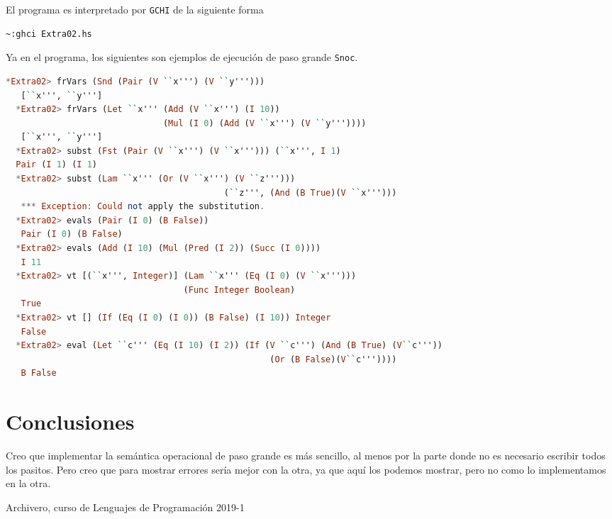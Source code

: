 \documentclass[spanish,12pt,letterpaper]{article}
\begin{document}
El programa es interpretado por \texttt{GCHI} de la siguiente forma
\begin{lstlisting}[]
  ~:ghci Extra02.hs
\end{lstlisting}

Ya en el programa, los siguientes son ejemplos de ejecución de paso grande \texttt{Snoc}.
\begin{lstlisting}[language=Haskell]
  *Extra02> frVars (Snd (Pair (V ``x''') (V ``y''')))
   [``x''', ``y''']
  *Extra02> frVars (Let ``x''' (Add (V ``x''') (I 10)) 
                               (Mul (I 0) (Add (V ``x''') (V ``y'''))))
   [``x''', ``y''']
  *Extra02> subst (Fst (Pair (V ``x''') (V ``x'''))) (``x''', I 1)
  Pair (I 1) (I 1)
  *Extra02> subst (Lam ``x''' (Or (V ``x''') (V ``z'''))) 
                                           (``z''', (And (B True)(V ``x''')))
   *** Exception: Could not apply the substitution.
  *Extra02> evals (Pair (I 0) (B False))
   Pair (I 0) (B False)
  *Extra02> evals (Add (I 10) (Mul (Pred (I 2)) (Succ (I 0))))
   I 11
  *Extra02> vt [(``x''', Integer)] (Lam ``x''' (Eq (I 0) (V ``x''')))
                                   (Func Integer Boolean)
   True
  *Extra02> vt [] (If (Eq (I 0) (I 0)) (B False) (I 10)) Integer
   False
  *Extra02> eval (Let ``c''' (Eq (I 10) (I 2)) (If (V ``c''') (And (B True) (V``c''')) 
                                                    (Or (B False)(V``c'''))))
   B False
\end{lstlisting}


\section{Conclusiones}

Creo que implementar la semántica operacional de paso grande es más sencillo, al
menos por la parte donde no es necesario escribir todos los pasitos. Pero creo
que para mostrar errores sería mejor con la otra, ya que aquí los podemos
mostrar, pero no como lo implementamos en la otra.

\begin{thebibliography}{9}

  Archivero, curso de Lenguajes de Programación 2019-1
\end{thebibliography}
\end{document}
